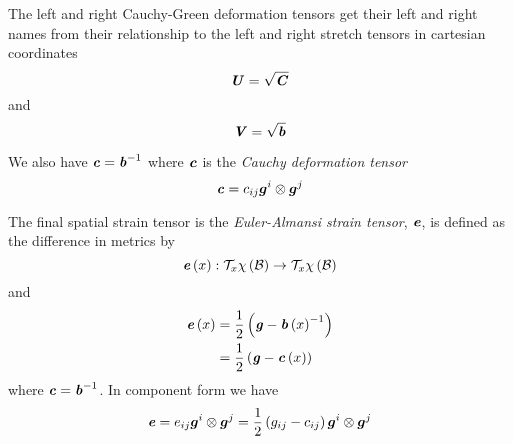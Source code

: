 The left and right Cauchy-Green deformation tensors get their left and right
names from their relationship to the left and right stretch tensors \ie in
cartesian coordinates
\begin{equation}
  \tensor{U}=\sqrt{\tensor{C}}
\end{equation}
and
\begin{equation}
  \tensor{V}=\sqrt{\tensor{b}}
\end{equation}

We also have $\tensor{c}=\inverse{\tensor{b}}$ where $\tensor{c}$ is the
\emph{Cauchy deformation tensor} \ie {}
\begin{equation}
	  \tensor{c}=c_{ij}\tensorprod{\vectr{g}^{i}}{\vectr{g}^{j}}
\end{equation}

The final spatial strain tensor is the \emph{Euler-Almansi strain tensor},
$\tensor{e}$, is defined as the difference in metrics
by
\begin{equation}
  \mapping{\fnof{\tensor{e}}{x}}{\tangentspace{\fnof{\chi}{\embedmanifold{B}}}{x}}{\tangentspace{\fnof{\chi}{\embedmanifold{B}}}{x}}
\end{equation}
and
\begin{equation}
  \begin{split}
    \fnof{\tensor{e}}{x}&=\frac{1}{2}\pbrac{\tensor{g}-\inverse{\fnof{\tensor{b}}{x}}}\\
    &= \frac{1}{2}\pbrac{\tensor{g}-\fnof{\tensor{c}}{x}}
  \end{split}
\end{equation}
where $\tensor{c}=\inverse{\tensor{b}}$. In component form we have
\begin{equation}
  \tensor{e}=e_{ij}\tensorprod{\vectr{g}^{i}}{\vectr{g}^{j}}=\frac{1}{2}\pbrac{g_{ij}-c_{ij}}\tensorprod{\vectr{g}^{i}}{\vectr{g}^{j}}
\end{equation}

